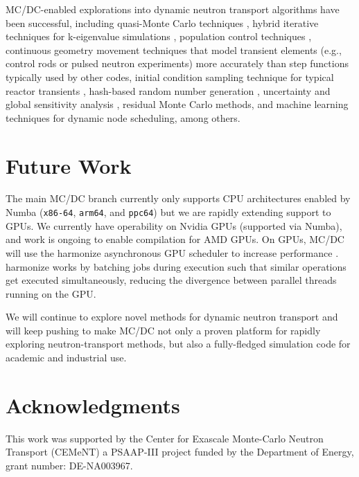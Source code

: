 MC/DC-enabled explorations into dynamic neutron transport algorithms have been successful, including quasi-Monte Carlo techniques \cite{mcdc:qmc}, hybrid iterative techniques for k-eigenvalue simulations \cite{mcdc:qmcabs}, population control techniques \cite{mcdc:variansyah_nse22_pct, mcdc:variansyah_physor22_pct}, continuous geometry movement techniques that model transient elements \cite{variansyah_2023_highfidelity} (e.g., control rods or pulsed neutron experiments) more accurately than step functions typically used by other codes, initial condition sampling technique for typical reactor transients \cite{variansyah_mc23_ic}, hash-based random number generation \cite{rngseed}, uncertainty and global sensitivity analysis \cite{mcdc:clements_mc23, mcdc:clements_variance_2024}, residual Monte Carlo methods, and machine learning techniques for dynamic node scheduling, among others.

\section{Future Work}

The main MC/DC branch currently only supports CPU architectures enabled by Numba (\texttt{x86-64}, \texttt{arm64}, and \texttt{ppc64}) but we are rapidly extending support to GPUs.
We currently have operability on Nvidia GPUs (supported via Numba), and work is ongoing to enable compilation for AMD GPUs.
On GPUs, MC/DC will use the harmonize asynchronous GPU scheduler to increase performance \cite{brax2023}.
harmonize works by batching jobs during execution such that similar operations get executed simultaneously, reducing the divergence between parallel threads running on the GPU.

We will continue to explore novel methods for dynamic neutron transport and will keep pushing to make MC/DC not only a proven platform for rapidly exploring neutron-transport methods, but also a fully-fledged simulation code for academic and industrial use.

\section*{Acknowledgments}

This work was supported by the Center for Exascale Monte-Carlo Neutron Transport (CEMeNT) a PSAAP-III project funded by the Department of Energy, grant number: DE-NA003967.